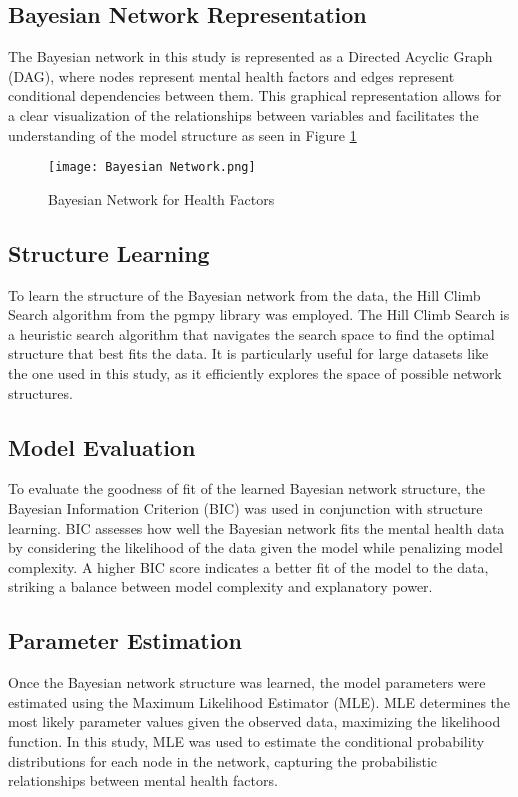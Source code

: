 \documentclass[conference]{IEEEtran}
\begin{document}
\subsection{Bayesian Network Representation}
The Bayesian network in this study is represented as a Directed Acyclic Graph (DAG), where nodes represent mental health factors and edges represent conditional dependencies between them. This graphical representation allows for a clear visualization of the relationships between variables and facilitates the understanding of the model structure as seen in Figure \ref{fig:Bayesian Network}
\begin{figure}[h]
\centering
\texttt{[image: Bayesian Network.png]}
\caption{Bayesian Network for Health Factors}
\label{fig:Bayesian Network}
\end{figure}
\subsection{Structure Learning}
To learn the structure of the Bayesian network from the data, the Hill Climb Search algorithm from the pgmpy library was employed. The Hill Climb Search is a heuristic search algorithm that navigates the search space to find the optimal structure that best fits the data. It is particularly useful for large datasets like the one used in this study, as it efficiently explores the space of possible network structures.

\subsection{Model Evaluation}
To evaluate the goodness of fit of the learned Bayesian network structure, the Bayesian Information Criterion (BIC) was used in conjunction with structure learning. BIC assesses how well the Bayesian network fits the mental health data by considering the likelihood of the data given the model while penalizing model complexity. A higher BIC score indicates a better fit of the model to the data, striking a balance between model complexity and explanatory power.

\subsection{Parameter Estimation}
Once the Bayesian network structure was learned, the model parameters were estimated using the Maximum Likelihood Estimator (MLE). MLE determines the most likely parameter values given the observed data, maximizing the likelihood function. In this study, MLE was used to estimate the conditional probability distributions for each node in the network, capturing the probabilistic relationships between mental health factors.
\end{document}
